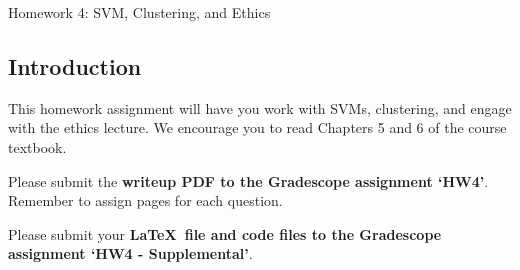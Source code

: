 \documentclass[submit]{harvardml}
\begin{document}
\begin{center}
{\Large Homework 4: SVM, Clustering, and Ethics}\\
\end{center}

\subsection*{Introduction}

This homework assignment will have you work with SVMs, 
clustering, and engage with the ethics lecture.  We encourage you to
read Chapters 5 and 6 of the course textbook.

Please submit the \textbf{writeup PDF to the Gradescope assignment `HW4'}. Remember to assign pages for each question.

Please submit your \textbf{\LaTeX\ file and code files to the Gradescope assignment `HW4 - Supplemental'}. 

\newpage
\end{document}
